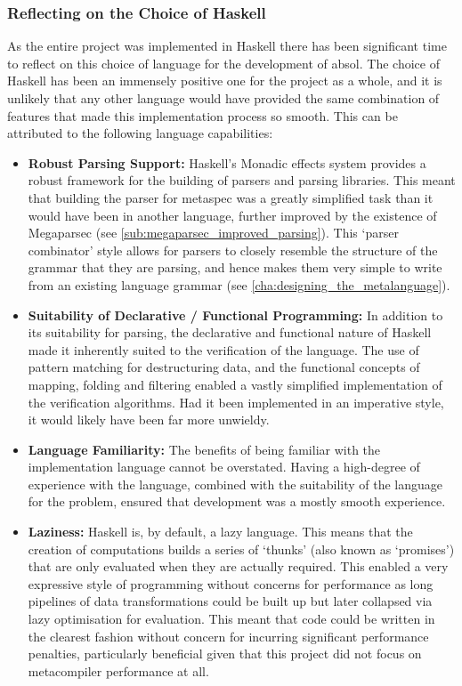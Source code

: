\subsubsection{Reflecting on the Choice of Haskell} %
\label{ssub:reflecting_on_the_choice_of_haskell}
As the entire project was implemented in Haskell there has been significant time to reflect on this choice of language for the development of \gls{absol}.
The choice of Haskell has been an immensely positive one for the project as a whole, and it is unlikely that any other language would have provided the same combination of features that made this implementation process so smooth.
This can be attributed to the following language capabilities:
\begin{itemize}
    \item \textbf{Robust Parsing Support:} Haskell's Monadic effects system provides a robust framework for the building of parsers and parsing libraries. 
    This meant that building the parser for \gls{metaspec} was a greatly simplified task than it would have been in another language, further improved by the existence of Megaparsec (see \autoref{sub:megaparsec_improved_parsing}). 
    This `parser combinator' style allows for parsers to closely resemble the structure of the grammar that they are parsing, and hence makes them very simple to write from an existing language grammar (see \autoref{cha:designing_the_metalanguage}).
    \item \textbf{Suitability of Declarative / Functional Programming:} In addition to its suitability for parsing, the declarative and functional nature of Haskell made it inherently suited to the verification of the language.
    The use of pattern matching for destructuring data, and the functional concepts of mapping, folding and filtering enabled a vastly simplified implementation of the verification algorithms.
    Had it been implemented in an imperative style, it would likely have been far more unwieldy. 
    \item \textbf{Language Familiarity:} The benefits of being familiar with the implementation language cannot be overstated. 
    Having a high-degree of experience with the language, combined with the suitability of the language for the problem, ensured that development was a mostly smooth experience. 
    \item \textbf{Laziness:} Haskell is, by default, a lazy language.
    This means that the creation of computations builds a series of `thunks' (also known as `promises') that are only evaluated when they are actually required.
    This enabled a very expressive style of programming without concerns for performance as long pipelines of data transformations could be built up but later collapsed via lazy optimisation for evaluation.
    This meant that code could be written in the clearest fashion without concern for incurring significant performance penalties, particularly beneficial given that this project did not focus on metacompiler performance at all.
\end{itemize}


